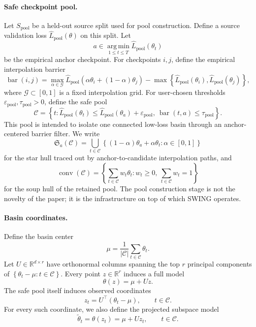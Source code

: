 \documentclass{article}
\newcommand{\RR}{\mathbb{R}}
\newcommand{\cC}{\mathcal{C}}
\newcommand{\argmin}{\operatorname*{arg\,min}}
\newcommand{\barrier}{\operatorname{bar}}
\newcommand{\swing}{\textup{\textsc{SWING}}}
\newcommand{\paren}[1]{\left( #1 \right)}
\newcommand{\braces}[1]{\left\{ #1 \right\}}
\begin{document}
\paragraph{Safe checkpoint pool.}
Let \(S_{\mathrm{pool}}\) be a held-out source split used for pool construction. Define a source validation loss \(\widehat L_{\mathrm{pool}}(\theta)\) on this split. Let
\[
a \in \argmin_{1\le t \le T}\widehat L_{\mathrm{pool}}(\theta_t)
\]
be the empirical anchor checkpoint. For checkpoints \(i,j\), define the empirical interpolation barrier
\[
\barrier(i,j)
=
\max_{\alpha\in\mathcal G}
\widehat L_{\mathrm{pool}}\paren{\alpha \theta_i + (1-\alpha)\theta_j}
-
\max\braces{\widehat L_{\mathrm{pool}}(\theta_i),\widehat L_{\mathrm{pool}}(\theta_j)},
\]
where \(\mathcal G \subset [0,1]\) is a fixed interpolation grid. For user-chosen thresholds \(\varepsilon_{\mathrm{pool}}, \tau_{\mathrm{pool}} > 0\), define the safe pool
\[
\cC
=
\braces{
t : \widehat L_{\mathrm{pool}}(\theta_t) \le \widehat L_{\mathrm{pool}}(\theta_a) + \varepsilon_{\mathrm{pool}},
\ \barrier(t,a)\le \tau_{\mathrm{pool}}
}.
\]
This pool is intended to isolate one connected low-loss basin through an anchor-centered barrier filter. We write
\[
\mathfrak{S}_a(\cC)
=
\bigcup_{t\in\cC}
\braces{(1-\alpha)\theta_a + \alpha \theta_t : \alpha\in[0,1]}
\]
for the star hull traced out by anchor-to-candidate interpolation paths, and
\[
\operatorname{conv}(\cC)
=
\braces{
\sum_{t\in\cC} w_t \theta_t :
w_t\ge 0,\ \sum_{t\in\cC} w_t = 1
}
\]
for the soup hull of the retained pool. The pool construction stage is not the novelty of the paper; it is the infrastructure on top of which \swing{} operates.

\paragraph{Basin coordinates.}
Define the basin center
\[
\mu = \frac{1}{|\cC|}\sum_{t\in\cC}\theta_t.
\]
Let \(U\in\RR^{d\times r}\) have orthonormal columns spanning the top \(r\) principal components of \(\braces{\theta_t-\mu : t\in\cC}\). Every point \(z\in\RR^r\) induces a full model
\[
\theta(z)=\mu + Uz.
\]
The safe pool itself induces observed coordinates
\[
z_t = U^\top(\theta_t - \mu), \qquad t\in\cC.
\]
For every such coordinate, we also define the projected subspace model
\[
\tilde\theta_t = \theta(z_t) = \mu + U z_t, \qquad t\in\cC.
\]
\end{document}
